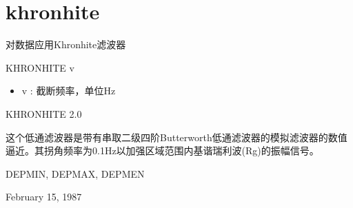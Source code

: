 \section{khronhite}
\label{cmd:khronhite}

对数据应用Khronhite滤波器

KHRONHITE {v}

\begin{itemize}
\item v : 截断频率，单位Hz
\end{itemize}

KHRONHITE 2.0

这个低通滤波器是带有串取二级四阶Butterworth低通滤波器的模拟滤波器的数值逼近。其拐角频率为0.1Hz以加强区域范围内基谐瑞利波(Rg)的振幅信号。

DEPMIN, DEPMAX, DEPMEN

February 15, 1987

